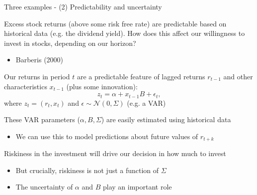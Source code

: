 \documentclass[notes,11pt, aspectratio=169]{beamer}
\newenvironment{wideitemize}{\itemize\addtolength{\itemsep}{10pt}}{\enditemize}
\begin{document}
\begin{frame}{Three examples - (2) Predictability and uncertainty}
  \begin{wideitemize}
  \item Excess stock returns (above some risk free rate) are
    predictable based on historical data (e.g. the dividend
    yield). How does this affect our willingness to invest in stocks,
    depending on our horizon?
    \begin{itemize}
    \item Barberis (2000)
    \end{itemize}
  \item Our returns in period $t$ are a predictable feature of lagged
    returns $r_{t-1}$ and other characteristics $x_{t-1}$ (plus some innovation):
    \begin{equation*}
      z_{t} = \alpha + x_{t-1}B +  \epsilon_{t},
    \end{equation*}
    where $z_{t} = (r_{t}, x_{t})$ and
    $\epsilon \sim \mathcal{N}(0,\Sigma)$ (e.g. a VAR)
  \item These VAR parameters ($\alpha, B, \Sigma$) are easily
    estimated using historical data
    \begin{itemize}
    \item We can use this to model predictions about future values of $r_{t+k}$
    \end{itemize}
  \item Riskiness in the investment will drive our decision in how much to invest
    \begin{itemize}
    \item But crucially, riskiness is not just a function of $\Sigma$
    \item The uncertainty of $\alpha$ and $B$ play an important role
    \end{itemize}
  \end{wideitemize}
\end{frame}
\end{document}

